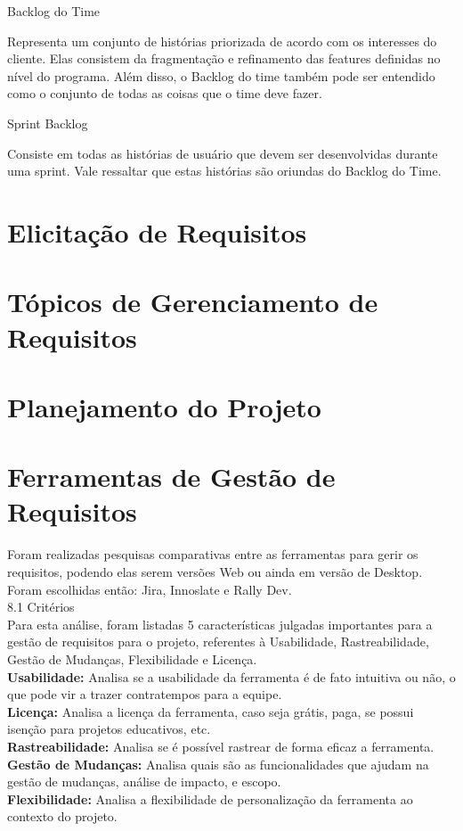 {{
	\large{Backlog do Time \\}

	\tab Representa um conjunto de histórias priorizada de acordo com os interesses do cliente. Elas consistem da fragmentação e refinamento das features definidas no nível do programa. Além disso, o Backlog do time também pode ser entendido como o conjunto de todas as coisas que o time deve fazer. \\
}

{
	\large{Sprint Backlog\\}

	\tab Consiste em todas as histórias de usuário que devem ser desenvolvidas durante uma sprint. Vale ressaltar que estas histórias são oriundas do Backlog do Time. \\
}
\section{Elicitação de Requisitos}
\label{sec:nova_sess_o}

\section{Tópicos de Gerenciamento de Requisitos}
\label{sec:nova_sess_o}

\section{Planejamento do Projeto}
\label{sec:nova_sess_o}

\section{Ferramentas de Gestão de Requisitos}
\label{sec}
\tab Foram realizadas pesquisas comparativas entre as ferramentas para gerir os requisitos, podendo elas serem versões Web ou ainda em versão de Desktop. Foram escolhidas então: Jira, Innoslate e Rally Dev.\\

{\large{8.1 Critérios}}\\

\tab Para esta análise, foram listadas 5 características julgadas importantes para a gestão de requisitos para o projeto, referentes à Usabilidade, Rastreabilidade, Gestão de Mudanças, Flexibilidade e Licença.\\
\tab \textbf{Usabilidade:} Analisa se a usabilidade da ferramenta é de fato intuitiva ou não, o que pode vir a trazer contratempos para a equipe.\\
\tab \textbf{Licença:} Analisa a licença da ferramenta, caso seja grátis, paga, se possui isenção para projetos educativos, etc.\\
\tab \textbf{Rastreabilidade:} Analisa se é possível rastrear de forma eficaz a ferramenta.\\
\tab \textbf{Gestão de Mudanças:} Analisa quais são as funcionalidades que ajudam na gestão de mudanças, análise de impacto, e escopo.\\
\tab \textbf{Flexibilidade:} Analisa a flexibilidade de personalização da ferramenta ao contexto do projeto.\\

}
